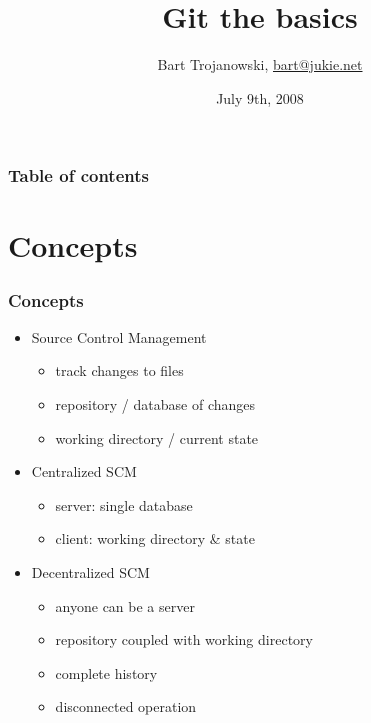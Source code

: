\documentclass[english]{beamer}
\title{Git the basics}
\author{Bart Trojanowski, \href{mailto:bart@jukie.net}{bart@jukie.net}}
\institute{Jukie Networks Inc.}
\date{July 9th, 2008}
\newcommand{\mysection}[2]{%
  \hypertarget{#2}{}%
  \section{#1}%
  \label{#2}%
}
\begin{document}
\label{header}\hypertarget{header}{}
\frame{\maketitle}

\begin{frame}
        \frametitle{Table of contents}
        \par\noindent
        \tableofcontents
\end{frame}

\mysection{Concepts}{_concepts}
\begin{frame}
\frametitle{Concepts}
\begin{itemize}
        \item Source Control Management
                \begin{itemize}
                        \item track changes to files
                        \item repository / database of changes
                        \item working directory / current state
                \end{itemize}

        \pause{}
        \item Centralized SCM
                \begin{itemize}
                        \item server: single database
                        \item client: working directory \&{} state
                \end{itemize}

        \pause{}
        \item Decentralized SCM
                \begin{itemize}
                        \item anyone can be a server
                        \item repository coupled with working directory
                        \item complete history
                        \item disconnected operation
                \end{itemize}
\end{itemize}

\end{frame}
\end{document}
